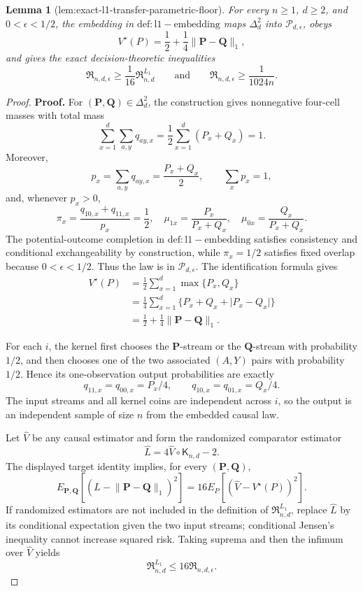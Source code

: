 \documentclass{article}
\newtheorem{lemma}{Lemma}
\begin{document}
\begin{lemma}[lem:exact-l1-transfer-parametric-floor]\label{lem:exact-l1-transfer-parametric-floor}
For every \(n\ge1\), \(d\ge2\), and \(0<\epsilon<1/2\), the embedding in \(\mathrm{def:l1-embedding}\) maps \(\Delta_d^2\) into \(\mathcal P_{d,\epsilon}\), obeys
\[
 V^\star(P)=\frac12+\frac14\lVert\mathbf P-\mathbf Q\rVert_1,
\]
and gives the exact decision-theoretic inequalities
\[
 \mathfrak R_{n,d,\epsilon}\ge\frac1{16}\mathfrak R^{L_1}_{n,d}
 \qquad\text{and}\qquad
 \mathfrak R_{n,d,\epsilon}\ge\frac{1}{1024n}.
\]
\end{lemma}
\begin{proof}
\textbf{Proof.}
For \((\mathbf P,\mathbf Q)\in\Delta_d^2\), the construction gives nonnegative four-cell masses with total mass
\[
 \sum_{x=1}^d\sum_{a,y}q_{ay,x}
 =\frac12\sum_{x=1}^d(P_x+Q_x)=1.
\]
Moreover,
\[
 p_x=\sum_{a,y}q_{ay,x}=\frac{P_x+Q_x}{2},
 \qquad
 \sum_xp_x=1,
\]
and, whenever \(p_x>0\),
\[
 \pi_x=\frac{q_{10,x}+q_{11,x}}{p_x}=\frac12,
 \quad
 \mu_{1x}=\frac{P_x}{P_x+Q_x},
 \quad
 \mu_{0x}=\frac{Q_x}{P_x+Q_x}.
\]
The potential-outcome completion in \(\mathrm{def:l1-embedding}\) satisfies consistency and conditional exchangeability by construction, while \(\pi_x=1/2\) satisfies fixed overlap because \(0<\epsilon<1/2\).  Thus the law is in \(\mathcal P_{d,\epsilon}\).  The identification formula gives
\[
 \begin{aligned}
 V^\star(P)
 &=\frac12\sum_{x=1}^d\max\{P_x,Q_x\}\\
 &=\frac14\sum_{x=1}^d\{P_x+Q_x+\lvert P_x-Q_x\rvert\}\\
 &=\frac12+\frac14\lVert\mathbf P-\mathbf Q\rVert_1.
 \end{aligned}
\]

For each \(i\), the kernel first chooses the \(\mathbf P\)-stream or the \(\mathbf Q\)-stream with probability \(1/2\), and then chooses one of the two associated \((A,Y)\) pairs with probability \(1/2\).  Hence its one-observation output probabilities are exactly
\[
 q_{11,x}=q_{00,x}=P_x/4,
 \qquad
 q_{10,x}=q_{01,x}=Q_x/4.
\]
The input streams and all kernel coins are independent across \(i\), so the output is an independent sample of size \(n\) from the embedded causal law.

Let \(\widehat V\) be any causal estimator and form the randomized comparator estimator
\[
 \widehat L=4\widehat V\circ\mathsf K_{n,d}-2.
\]
The displayed target identity implies, for every \((\mathbf P,\mathbf Q)\),
\[
 E_{\mathbf P,\mathbf Q}\!\left[
   (\widehat L-\lVert\mathbf P-\mathbf Q\rVert_1)^2
 \right]
 =16E_P[(\widehat V-V^\star(P))^2].
\]
If randomized estimators are not included in the definition of \(\mathfrak R^{L_1}_{n,d}\), replace \(\widehat L\) by its conditional expectation given the two input streams; conditional Jensen's inequality cannot increase squared risk.  Taking suprema and then the infimum over \(\widehat V\) yields
\[
 \mathfrak R^{L_1}_{n,d}\le16\mathfrak R_{n,d,\epsilon}.
\]


\end{proof}
\end{document}
